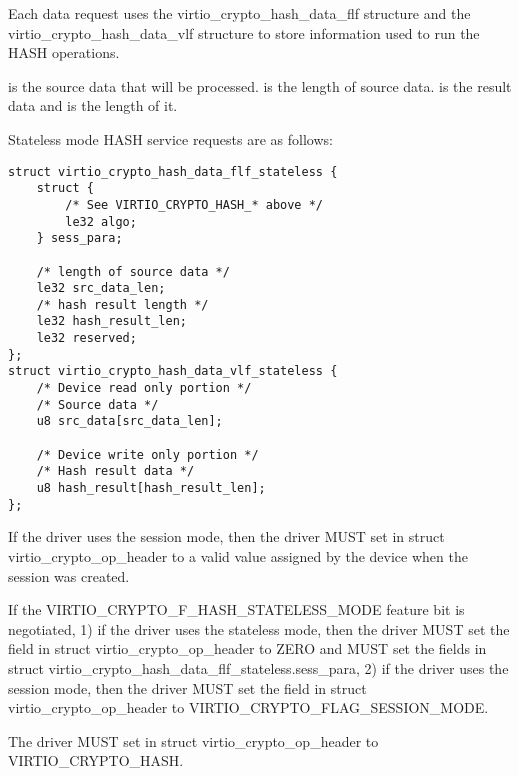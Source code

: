 Each data request uses the virtio_crypto_hash_data_flf structure and the
virtio_crypto_hash_data_vlf structure to store information used to run the
HASH operations.

 is the source data that will be processed.
 is the length of source data.
 is the result data and  is the length
of it.

Stateless mode HASH service requests are as follows:

\begin{lstlisting}
struct virtio_crypto_hash_data_flf_stateless {
    struct {
        /* See VIRTIO_CRYPTO_HASH_* above */
        le32 algo;
    } sess_para;

    /* length of source data */
    le32 src_data_len;
    /* hash result length */
    le32 hash_result_len;
    le32 reserved;
};
struct virtio_crypto_hash_data_vlf_stateless {
    /* Device read only portion */
    /* Source data */
    u8 src_data[src_data_len];

    /* Device write only portion */
    /* Hash result data */
    u8 hash_result[hash_result_len];
};
\end{lstlisting}


\begin{itemize*}
\item If the driver uses the session mode, then the driver MUST set 
    in struct virtio_crypto_op_header to a valid value assigned by the device when the
    session was created.
\item If the VIRTIO_CRYPTO_F_HASH_STATELESS_MODE feature bit is negotiated, 1) if the
    driver uses the stateless mode, then the driver MUST set the  field in
    struct virtio_crypto_op_header to ZERO and MUST set the fields in struct
    virtio_crypto_hash_data_flf_stateless.sess_para, 2) if the driver uses the session
    mode, then the driver MUST set the  field in struct virtio_crypto_op_header
    to VIRTIO_CRYPTO_FLAG_SESSION_MODE.
\item The driver MUST set  in struct virtio_crypto_op_header to VIRTIO_CRYPTO_HASH.
\end{itemize*}

